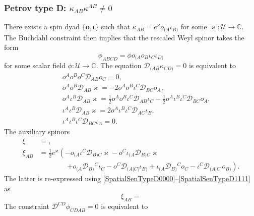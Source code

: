 \documentclass[10pt,a4paper]{article}
\newcommand\omicron{o}
\theoremstyle{plain}
\begin{document}
\subsubsection{Petrov type D: $\kappa_{AB}\kappa^{AB}\neq 0$}

There exists a spin dyad $\lbrace \bm\omicron, \bm\iota\rbrace$ such that $\kappa_{AB} = e^{\varkappa} \omicron_{(A}\iota_{B)}$ for some $\varkappa:\mathcal{U}\rightarrow\mathbb{C}$. The Buchdahl constraint then implies that the rescaled Weyl spinor takes the form
\[ \phi_{ABCD}= \phi \omicron_{(A}\omicron_B\iota_C\iota_{D)}\]
for some scalar field $\phi:\mathcal{U}\rightarrow\mathbb{C}$. The equation $\mathcal{D}_{(AB}\kappa_{CD)}=0$ is equivalent to 
\begin{subequations}
\begin{eqnarray}
&& \omicron^A\omicron^B\omicron^C\mathcal{D}_{AB}\omicron_C=0,\label{SpatialSenTypeD0000}\\
&& o^{A} o^{B} \mathcal{D}_{AB}\varkappa = -2 o^{A} o^{B} \iota^{C} \mathcal{D}_{BC}o_{A},\\
&& o^{A} \iota^{B} \mathcal{D}_{AB}\varkappa = \tfrac{1}{2} o^{A} o^{B} \iota^{C} \mathcal{D}_{AB}\iota_{C} -  \tfrac{1}{2} o^{A} \iota^{B} \iota^{C} \mathcal{D}_{BC}o_{A},\\
&& \iota^{A} \iota^{B} \mathcal{D}_{AB}\varkappa = 2 o^{A} \iota^{B} \iota^{C} \mathcal{D}_{AC}\iota_{B},\\
&& \iota^{A} \iota^{B} \iota^{C} \mathcal{D}_{BC}\iota_{A} = 0.\label{SpatialSenTypeD1111}
\end{eqnarray}
\end{subequations}
The auxiliary spinors 
\begin{align*} 
\xi &= ,\\
\xi_{AB} &= \tfrac{1}{2} e^{\varkappa} \left(-   o_{(A}\iota^{C}\mathcal{D}_{B)C}\varkappa-   o^{C}\iota_{(A}\mathcal{D}_{B)C}\varkappa\right.\\
& \qquad\qquad\left.+o_{(A}\mathcal{D}_{B)}{}^{C}\iota_{C} -  o^{C}\mathcal{D}_{(A|C|}\iota_{B)} + \iota_{(A}\mathcal{D}_{B)}{}^{C}o_{C} -  \iota^{C}\mathcal{D}_{(A|C|}o_{B)} \right).
\end{align*}
The latter is re-expressed using \eqref{SpatialSenTypeD0000}--\eqref{SpatialSenTypeD1111} as 
\[ \xi_{AB} = \]
The constraint $\mathcal{D}^{CD}\phi_{CDAB}=0$ is equivalent to 
\end{document}
